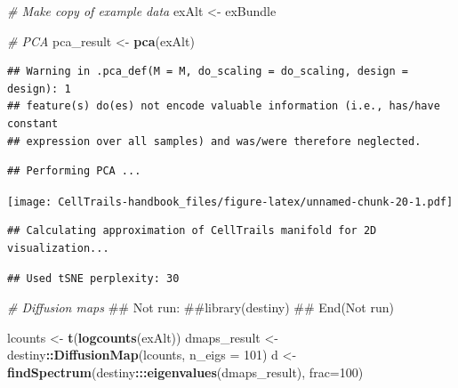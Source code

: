 \documentclass[]{book}
\newenvironment{Shaded}{\begin{snugshade}}{\end{snugshade}}
\newcommand{\KeywordTok}[1]{\textcolor[rgb]{0.13,0.29,0.53}{\textbf{#1}}}
\newcommand{\DataTypeTok}[1]{\textcolor[rgb]{0.13,0.29,0.53}{#1}}
\newcommand{\DecValTok}[1]{\textcolor[rgb]{0.00,0.00,0.81}{#1}}
\newcommand{\StringTok}[1]{\textcolor[rgb]{0.31,0.60,0.02}{#1}}
\newcommand{\CommentTok}[1]{\textcolor[rgb]{0.56,0.35,0.01}{\textit{#1}}}
\newcommand{\OperatorTok}[1]{\textcolor[rgb]{0.81,0.36,0.00}{\textbf{#1}}}
\newcommand{\NormalTok}[1]{#1}
\theoremstyle{definition}
\theoremstyle{definition}
\theoremstyle{definition}
\theoremstyle{remark}
\begin{document}
\begin{Shaded}
\begin{Highlighting}[]
\CommentTok{# Make copy of example data}
\NormalTok{exAlt <-}\StringTok{ }\NormalTok{exBundle}

\CommentTok{# PCA}
\NormalTok{pca_result <-}\StringTok{ }\KeywordTok{pca}\NormalTok{(exAlt)}
\end{Highlighting}
\end{Shaded}

\begin{verbatim}
## Warning in .pca_def(M = M, do_scaling = do_scaling, design = design): 1
## feature(s) do(es) not encode valuable information (i.e., has/have constant
## expression over all samples) and was/were therefore neglected.
\end{verbatim}

\begin{verbatim}
## Performing PCA ...
\end{verbatim}

\begin{Shaded}
\end{Shaded}

\texttt{[image: CellTrails-handbook\_files/figure-latex/unnamed-chunk-20-1.pdf]}

\begin{Shaded}
\end{Shaded}

\begin{verbatim}
## Calculating approximation of CellTrails manifold for 2D visualization...
\end{verbatim}

\begin{verbatim}
## Used tSNE perplexity: 30
\end{verbatim}

\begin{Shaded}
\begin{Highlighting}[]
\CommentTok{# Diffusion maps}
\NormalTok{## Not run: }
\NormalTok{##library(destiny)}
\NormalTok{## End(Not run)}

\NormalTok{lcounts <-}\StringTok{ }\KeywordTok{t}\NormalTok{(}\KeywordTok{logcounts}\NormalTok{(exAlt))}
\NormalTok{dmaps_result <-}\StringTok{ }\NormalTok{destiny}\OperatorTok{::}\KeywordTok{DiffusionMap}\NormalTok{(lcounts, }\DataTypeTok{n_eigs =} \DecValTok{101}\NormalTok{)}
\NormalTok{d <-}\StringTok{ }\KeywordTok{findSpectrum}\NormalTok{(destiny}\OperatorTok{:::}\KeywordTok{eigenvalues}\NormalTok{(dmaps_result), }\DataTypeTok{frac=}\DecValTok{100}\NormalTok{)}
\end{Highlighting}
\end{Shaded}
\end{document}
